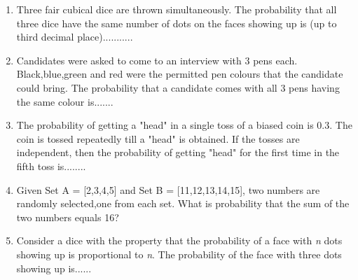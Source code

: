 \documentclass[journal,12pt,twocolumn]{IEEEtran}
\begin{document}
\begin{enumerate}
\begin{enumerate}
\end{enumerate}
\solution

\item Three fair cubical dice are thrown simultaneously. The probability that all three dice have the same number of dots on the faces showing up is (up to third decimal place)...........
\solution


\item Candidates were asked to come to an interview with 3 pens each. Black,blue,green and red were the permitted pen colours that the candidate could bring. The probability that a candidate comes with all 3 pens having the same colour is.......

\item The probability of getting a "head" in a single toss of a biased coin is 0.3. The coin is tossed repeatedly till a "head" is obtained. If the tosses are independent, then the probability of getting "head" for the first time in the fifth toss is........
\solution



\item Given Set A = [2,3,4,5] and Set B = [11,12,13,14,15], two numbers are randomly selected,one from each set. What is probability that the sum of the two numbers equals 16?

\begin{enumerate}
\end{enumerate}
\solution


\item Consider a dice with the property that the probability of a face with \textit{n} dots showing up is proportional to \textit{n}. The probability of the face with three dots showing up is......
%
\solution



\end{enumerate}
\end{document}
